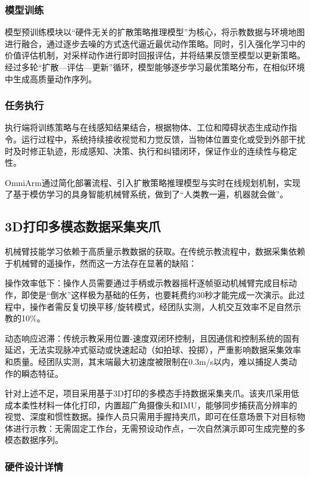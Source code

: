 \documentclass[zihao=-4]{ctexart}
\begin{document}
\subsubsection{模型训练}

模型预训练模块以“硬件无关的扩散策略推理模型”为核心，将示教数据与环境地图进行融合，通过逐步去噪的方式迭代逼近最优动作策略。同时，引入强化学习中的价值评估机制，对采样动作进行即时回报评估，并将结果反馈至模型以更新策略。经过多轮“扩散—评估—更新”循环，模型能够逐步学习最优策略分布，在相似环境中生成高质量动作序列。

\subsubsection{任务执行}

执行端将训练策略与在线感知结果结合，根据物体、工位和障碍状态生成动作指令。运行过程中，系统持续接收视觉和力觉反馈，当物体位置变化或受到外部干扰时及时修正轨迹，形成感知、决策、执行和纠错闭环，保证作业的连续性与稳定性。

OmniArm通过简化部署流程、引入扩散策略推理模型与实时在线规划机制，实现了基于模仿学习的具身智能机械臂系统，做到了“人类教一遍，机器就会做”。

\subsection{3D打印多模态数据采集夹爪}

机械臂技能学习依赖于高质量示教数据的获取。在传统示教流程中，数据采集依赖于机械臂的遥操作，然而这一方法存在显著的缺陷：

操作效率低下：操作人员需要通过手柄或示教器摇杆逐帧驱动机械臂完成目标动作，即使是“倒水”这样极为基础的任务，也要耗费约30秒才能完成一次演示。此过程中，操作者需反复切换平移/旋转模式，经团队实测，人机交互效率不足自然示教的10\%。

动态响应迟滞：传统示教采用位置-速度双闭环控制，且因通信和控制系统的固有延迟，无法实现脉冲式驱动或快速起动（如拍球、投掷），严重影响数据采集效率和质量。经团队实测，其末端最大初速度被限制在0.3m/s以内，难以捕捉人类动作的瞬态特征。

针对上述不足，项目采用基于3D打印的多模态手持数据采集夹爪。该夹爪采用低成本柔性材料一体化打印，内置超广角摄像头和IMU，能够同步捕获高分辨率的视觉、深度和惯性数据。操作人员只需用手握持夹爪，即可在任意场景下对目标物体进行示教：无需固定工作台，无需预设动作点，一次自然演示即可生成完整的多模态数据序列。

\subsubsection{硬件设计详情}
\end{document}
